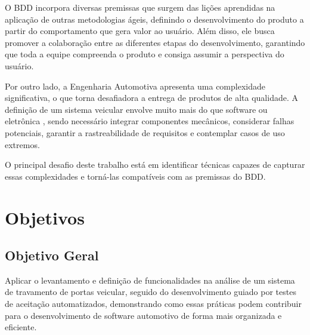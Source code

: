 O BDD incorpora diversas premissas que surgem das lições aprendidas na aplicação de outras metodologias ágeis, definindo o desenvolvimento do produto a partir do 
comportamento que gera valor ao usuário. Além disso, ele busca promover a colaboração entre as diferentes etapas do desenvolvimento, garantindo que toda a equipe 
compreenda o produto e consiga assumir a perspectiva do usuário.

Por outro lado, a Engenharia Automotiva apresenta uma complexidade significativa, o que torna desafiadora a entrega de produtos de alta qualidade. A definição de 
um sistema veicular envolve muito mais do que software ou eletrônica \cite{bosch2022handbook}, sendo necessário integrar componentes mecânicos, considerar falhas 
potenciais, garantir a rastreabilidade de requisitos e contemplar casos de uso extremos.

O principal desafio deste trabalho está em identificar técnicas capazes de capturar essas complexidades e torná-las compatíveis com as premissas do BDD.

\section{\textbf{Objetivos}}

\subsection{Objetivo Geral}
Aplicar o levantamento e definição de funcionalidades na análise de um sistema de travamento de portas veicular, seguido do desenvolvimento guiado por testes de 
aceitação automatizados, demonstrando como essas práticas podem contribuir para o desenvolvimento de software automotivo de forma mais organizada e eficiente.

